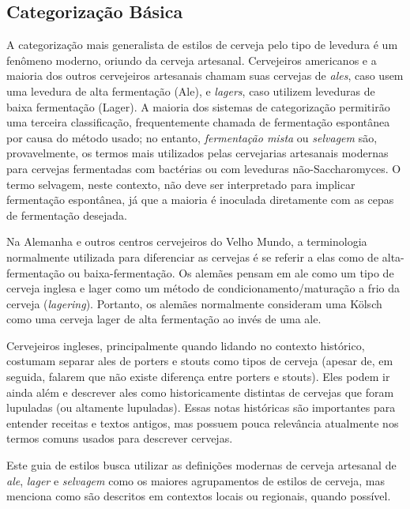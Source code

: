 \subsection*{Categorização Básica}
A categorização mais generalista de estilos de cerveja pelo tipo de levedura é um fenômeno moderno, oriundo da cerveja artesanal. Cervejeiros americanos e a maioria dos outros cervejeiros artesanais chamam suas cervejas de \textit{ales}, caso usem uma levedura de alta fermentação (Ale), e \textit{lagers}, caso utilizem leveduras de baixa fermentação (Lager). A maioria dos sistemas de categorização permitirão uma terceira classificação, frequentemente chamada de fermentação espontânea por causa do método usado; no entanto, \textit{fermentação mista} ou \textit{selvagem} são, provavelmente, os termos mais utilizados pelas cervejarias artesanais modernas para cervejas fermentadas com bactérias ou com leveduras não-Saccharomyces. O termo selvagem, neste contexto, não deve ser interpretado para implicar fermentação espontânea, já que a maioria é inoculada diretamente com as cepas de fermentação desejada.

Na Alemanha e outros centros cervejeiros do Velho Mundo, a terminologia normalmente utilizada para diferenciar as cervejas é se referir a elas como de alta-fermentação ou baixa-fermentação. Os alemães pensam em ale como um tipo de cerveja inglesa e lager como um método de condicionamento/maturação a frio da cerveja (\textit{lagering}). Portanto, os alemães normalmente consideram uma Kölsch como uma cerveja lager de alta fermentação ao invés de uma ale.

Cervejeiros ingleses, principalmente quando lidando no contexto histórico, costumam separar ales de porters e stouts como tipos de cerveja (apesar de, em seguida, falarem que não existe diferença entre porters e stouts). Eles podem ir ainda além e descrever ales como historicamente distintas de cervejas que foram lupuladas (ou altamente lupuladas). Essas notas históricas são importantes para entender receitas e textos antigos, mas possuem pouca relevância atualmente nos termos comuns usados para descrever cervejas.

Este guia de estilos busca utilizar as definições modernas de cerveja artesanal de \textit{ale}, \textit{lager} e \textit{selvagem} como os maiores agrupamentos de estilos de cerveja, mas menciona como são descritos em contextos locais ou regionais, quando possível.
